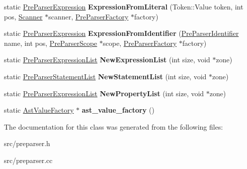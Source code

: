 \begin{DoxyCompactItemize}
\item 
\hypertarget{classv8_1_1internal_1_1_pre_parser_traits_a5330f8cc2a8ae1448e5cd0eb0690a3a6}{}static \hyperlink{classv8_1_1internal_1_1_pre_parser_expression}{Pre\+Parser\+Expression} {\bfseries Expression\+From\+Literal} (Token\+::\+Value token, int pos, \hyperlink{classv8_1_1internal_1_1_scanner}{Scanner} $\ast$scanner, \hyperlink{classv8_1_1internal_1_1_pre_parser_factory}{Pre\+Parser\+Factory} $\ast$factory)\label{classv8_1_1internal_1_1_pre_parser_traits_a5330f8cc2a8ae1448e5cd0eb0690a3a6}

\item 
\hypertarget{classv8_1_1internal_1_1_pre_parser_traits_a3e047dfff95cbe3b0a564d6e97d6cbfe}{}static \hyperlink{classv8_1_1internal_1_1_pre_parser_expression}{Pre\+Parser\+Expression} {\bfseries Expression\+From\+Identifier} (\hyperlink{classv8_1_1internal_1_1_pre_parser_identifier}{Pre\+Parser\+Identifier} name, int pos, \hyperlink{classv8_1_1internal_1_1_pre_parser_scope}{Pre\+Parser\+Scope} $\ast$scope, \hyperlink{classv8_1_1internal_1_1_pre_parser_factory}{Pre\+Parser\+Factory} $\ast$factory)\label{classv8_1_1internal_1_1_pre_parser_traits_a3e047dfff95cbe3b0a564d6e97d6cbfe}

\item 
\hypertarget{classv8_1_1internal_1_1_pre_parser_traits_a8cd60f030efc90cc903fc924270f8f2a}{}static \hyperlink{classv8_1_1internal_1_1_pre_parser_expression_list}{Pre\+Parser\+Expression\+List} {\bfseries New\+Expression\+List} (int size, void $\ast$zone)\label{classv8_1_1internal_1_1_pre_parser_traits_a8cd60f030efc90cc903fc924270f8f2a}

\item 
\hypertarget{classv8_1_1internal_1_1_pre_parser_traits_a00e7dbf368799befe36b38e53b26aac8}{}static \hyperlink{classv8_1_1internal_1_1_pre_parser_statement_list}{Pre\+Parser\+Statement\+List} {\bfseries New\+Statement\+List} (int size, void $\ast$zone)\label{classv8_1_1internal_1_1_pre_parser_traits_a00e7dbf368799befe36b38e53b26aac8}

\item 
\hypertarget{classv8_1_1internal_1_1_pre_parser_traits_a88d8e57ce85f94f1a4080cd648c59419}{}static \hyperlink{classv8_1_1internal_1_1_pre_parser_expression_list}{Pre\+Parser\+Expression\+List} {\bfseries New\+Property\+List} (int size, void $\ast$zone)\label{classv8_1_1internal_1_1_pre_parser_traits_a88d8e57ce85f94f1a4080cd648c59419}

\item 
\hypertarget{classv8_1_1internal_1_1_pre_parser_traits_a60b44f64b723e4799bc2f96cd3d391f6}{}static \hyperlink{classv8_1_1internal_1_1_ast_value_factory}{Ast\+Value\+Factory} $\ast$ {\bfseries ast\+\_\+value\+\_\+factory} ()\label{classv8_1_1internal_1_1_pre_parser_traits_a60b44f64b723e4799bc2f96cd3d391f6}

\end{DoxyCompactItemize}


The documentation for this class was generated from the following files\+:\begin{DoxyCompactItemize}
\item 
src/preparser.\+h\item 
src/preparser.\+cc\end{DoxyCompactItemize}
